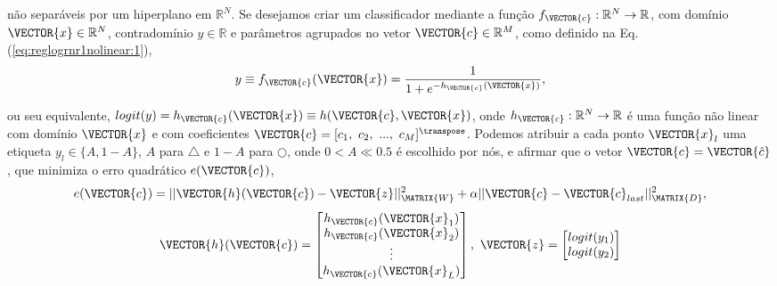 \begin{theorem}
\begin{minipage}{0.55\textwidth}
não separáveis por um hiperplano  em $\mathbb{R}^{N}$.
Se desejamos criar um classificador mediante 
a função  $f_{\VECTOR{c}}:\mathbb{R}^{N} \rightarrow \mathbb{R}$,
com domínio $\VECTOR{x} \in \mathbb{R}^{N}$, contradomínio $y \in \mathbb{R}$ e 
parâmetros agrupados no vetor $\VECTOR{c} \in \mathbb{R}^{M}$,
como definido na Eq. (\ref{eq:reglogrnr1nolinear:1}),
\begin{equation}\label{eq:reglogrnr1nolinear:1}
y\equiv f_{\VECTOR{c}}(\VECTOR{x})= \frac{1}{1+e^{-h_{\VECTOR{c}}(\VECTOR{x})}},
\end{equation}
\end{minipage}
ou seu equivalente, $logit(y)=h_{\VECTOR{c}}(\VECTOR{x})\equiv h(\VECTOR{c},\VECTOR{x})$,
onde $h_{\VECTOR{c}}: \mathbb{R}^{N} \rightarrow \mathbb{R}$ é uma função não linear
com domínio $\VECTOR{x}$ e
com coeficientes $\VECTOR{c}=[c_1,~c_2,~...,~c_M]^{\transpose}$.
Podemos atribuir a cada ponto $\VECTOR{x}_l$ uma etiqueta $y_l\in \{A,1-A\}$, 
$A$ para $\bigtriangleup$ e  $1-A$ para $\bigcirc$,
onde $0<A\ll 0.5$ é escolhido por nós,
e afirmar que o vetor $\VECTOR{c}= \VECTOR{\hat{c}}$,
que minimiza o erro quadrático $e(\VECTOR{c})$,
\begin{equation}\label{eq:reglogrnr1nolinear:1e}
e(\VECTOR{c}) =  ||\VECTOR{h}(\VECTOR{c})-\VECTOR{z}||_{\MATRIX{W}}^2 + \alpha||\VECTOR{c}-\VECTOR{c}_{last}||_{\MATRIX{D}}^2,
\end{equation}
\begin{equation}
\VECTOR{h}(\VECTOR{c})=\begin{bmatrix}
h_{\VECTOR{c}}(\VECTOR{x}_1)\\ 
h_{\VECTOR{c}}(\VECTOR{x}_2)\\ 
\vdots\\ 
h_{\VECTOR{c}}(\VECTOR{x}_L)
\end{bmatrix},
~
\VECTOR{z}=
\begin{bmatrix}
logit(y_1)  \\
logit(y_2)  \\

\end{bmatrix}
\end{equation}
\end{theorem}
